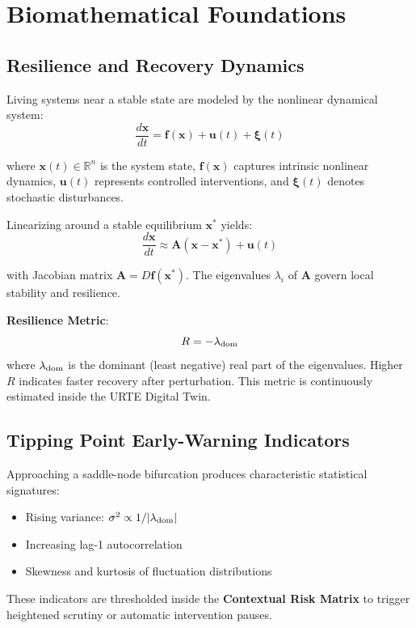 \documentclass[11pt,a4paper]{report}
\begin{document}
\section{Biomathematical Foundations}

\subsection{Resilience and Recovery Dynamics}

Living systems near a stable state are modeled by the nonlinear dynamical system:
\[
\frac{d\mathbf{x}}{dt} = \mathbf{f}(\mathbf{x}) + \mathbf{u}(t) + \boldsymbol{\xi}(t)
\]

where $\mathbf{x}(t) \in \mathbb{R}^n$ is the system state, $\mathbf{f}(\mathbf{x})$ captures intrinsic nonlinear dynamics, $\mathbf{u}(t)$ represents controlled interventions, and $\boldsymbol{\xi}(t)$ denotes stochastic disturbances.

Linearizing around a stable equilibrium $\mathbf{x}^*$ yields:
\[
\frac{d\mathbf{x}}{dt} \approx \mathbf{A}(\mathbf{x} - \mathbf{x}^*) + \mathbf{u}(t)
\]

with Jacobian matrix $\mathbf{A} = D\mathbf{f}(\mathbf{x}^*)$. The eigenvalues $\lambda_i$ of $\mathbf{A}$ govern local stability and resilience.

\textbf{Resilience Metric}:
\[
R = -\lambda_{\rm dom}
\]
where $\lambda_{\rm dom}$ is the dominant (least negative) real part of the eigenvalues. Higher $R$ indicates faster recovery after perturbation. This metric is continuously estimated inside the URTE Digital Twin.

\subsection{Tipping Point Early-Warning Indicators}

Approaching a saddle-node bifurcation produces characteristic statistical signatures:
\begin{itemize}
    \item Rising variance: $\sigma^2 \propto 1/|\lambda_{\rm dom}|$
    \item Increasing lag-1 autocorrelation
    \item Skewness and kurtosis of fluctuation distributions
\end{itemize}

These indicators are thresholded inside the \textbf{Contextual Risk Matrix} to trigger heightened scrutiny or automatic intervention pauses.
\end{document}
